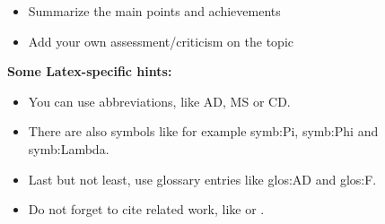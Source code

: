 \documentclass[12pt]%
{article}
\begin{document}
\begin{itemize}
\item Summarize the main points and achievements
\item Add your own assessment/criticism on the topic
\end{itemize}


\textbf{Some Latex-specific hints:}


\begin{itemize}
\item You can use abbreviations, like \gls{AD}, \gls{MS} or \gls{CD}.
\item There are also symbols like for example \gls{symb:Pi}, \gls{symb:Phi} and \gls{symb:Lambda}.
\item Last but not least, use glossary entries like \gls{glos:AD} and \gls{glos:F}.
\item Do not forget to cite related work, like \cite{okman2011security} or \cite{borthakur2011apache}.
\end{itemize}
\newpage

\printglossary[style=altlist,title=Glossary]
 
\printglossary[type=\acronymtype,style=long]
 
\printglossary[type=symbolslist,style=long]

\newpage



\end{document}
